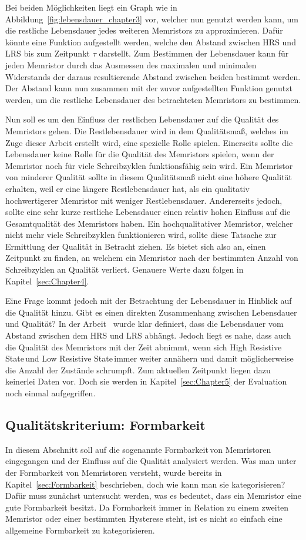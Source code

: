   Bei beiden Möglichkeiten liegt ein Graph wie in Abbildung~\ref{fig:lebensdauer_chapter3} vor, welcher nun genutzt werden kann, um die restliche Lebensdauer jedes weiteren Memristors zu approximieren. Dafür könnte eine Funktion aufgestellt werden, welche den Abstand zwischen HRS und LRS bis zum Zeitpunkt $\tau$ darstellt. Zum Bestimmen der Lebensdauer kann für jeden Memristor durch das Ausmessen des maximalen und minimalen Widerstands der daraus resultierende Abstand zwischen beiden bestimmt werden. Der Abstand kann nun zusammen mit der zuvor aufgestellten Funktion genutzt werden, um die restliche Lebensdauer des betrachteten Memristors zu bestimmen.

  Nun soll es um den Einfluss der restlichen Lebensdauer auf die Qualität des Memristors gehen. Die Restlebensdauer wird in dem Qualitätsmaß, welches im Zuge dieser Arbeit erstellt wird, eine spezielle Rolle spielen. Einerseits sollte die Lebensdauer keine Rolle für die Qualität des Memristors spielen, wenn der Memristor noch für viele Schreibzyklen funktionsfähig sein wird. Ein Memristor von minderer Qualität sollte in diesem Qualitätsmaß nicht eine höhere Qualität erhalten, weil er eine längere Restlebensdauer hat, als ein qualitativ hochwertigerer Memristor mit weniger Restlebensdauer. Andererseits jedoch, sollte eine sehr kurze restliche Lebensdauer einen relativ hohen Einfluss auf die Gesamtqualität des Memristors haben. Ein hochqualitativer Memristor, welcher nicht mehr viele Schreibzyklen funktionieren wird, sollte diese Tatsache zur Ermittlung der Qualität in Betracht ziehen. Es bietet sich also an, einen Zeitpunkt zu finden, an welchem ein Memristor nach der bestimmten Anzahl von Schreibzyklen an Qualität verliert. Genauere Werte dazu folgen in Kapitel~\ref{sec:Chapter4}.

  Eine Frage kommt jedoch mit der Betrachtung der Lebensdauer in Hinblick auf die Qualität hinzu. Gibt es einen direkten Zusammenhang zwischen Lebensdauer und Qualität? In der Arbeit~\cite{stat_lifetime} wurde klar definiert, dass die Lebensdauer vom Abstand zwischen dem HRS und LRS abhängt. Jedoch liegt es nahe, dass auch die Qualität des Memristors mit der Zeit abnimmt, wenn sich \glqq High Resistive State\grqq\,und \glqq Low Resistive State\grqq\,immer weiter annähern und damit möglicherweise die Anzahl der Zustände schrumpft. Zum aktuellen Zeitpunkt liegen dazu keinerlei Daten vor. Doch sie werden in Kapitel~\ref{sec:Chapter5} der Evaluation noch einmal aufgegriffen.

\subsection{Qualitätskriterium: Formbarkeit}
  In diesem Abschnitt soll auf die sogenannte \glqq Formbarkeit\grqq\,von Memristoren eingegangen und der Einfluss auf die Qualität analysiert werden. Was man unter der Formbarkeit von Memristoren versteht, wurde bereits in Kapitel~\ref{sec:Formbarkeit} beschrieben, doch wie kann man sie kategorisieren? Dafür muss zunächst untersucht werden, was es bedeutet, dass ein Memristor eine gute Formbarkeit besitzt. Da Formbarkeit immer in Relation zu einem zweiten Memristor oder einer bestimmten Hysterese steht, ist es nicht so einfach eine allgemeine Formbarkeit zu kategorisieren.

